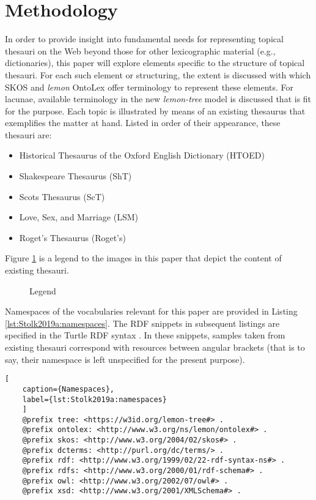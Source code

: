 \section{Methodology}

In order to provide insight into fundamental needs for representing topical thesauri on the Web beyond those for other lexicographic material (e.g., dictionaries), this paper will explore elements specific to the structure of topical thesauri. For each such element or structuring, the extent is discussed with which SKOS and \emph{lemon} OntoLex offer terminology to represent these elements. For lacunae, available terminology in the new \emph{lemon-tree} model is discussed that is fit for the purpose. Each topic is illustrated by means of an existing thesaurus that exemplifies the matter at hand. Listed in order of their appearance, these thesauri are:

\begin{itemize}
	\item Historical Thesaurus of the Oxford English Dictionary (HTOED) \cite{ref-HTOED}
	\item Shakespeare Thesaurus (ShT) \cite{ref-ShT}
	\item Scots Thesaurus (ScT) \cite{ref-ScT}
	\item Love, Sex, and Marriage (LSM) \cite{ref-LSM}
	\item Roget's Thesaurus (Roget's) \cite{ref-Roget}
\end{itemize}

\noindent
Figure \ref{fig:Stolk2019a:legend} is a legend to the images in this paper that depict the content of existing thesauri.

\begin{figure}[htbp]
	\framebox[\textwidth]{
		\scalebox{0.7}[0.7]{
			
		}
	}
	\caption[]{\label{fig:Stolk2019a:legend} Legend}
\end{figure} 

Namespaces of the vocabularies relevant for this paper are provided in Listing \ref{lst:Stolk2019a:namespaces}. The RDF snippets in subsequent listings are specified in the Turtle RDF syntax \cite{prudhommeaux_rdf_2014}. In these snippets, samples taken from existing thesauri correspond with resources between angular brackets (that is to say, their namespace is left unspecified for the present purpose).

\noindent
\begin{minipage}[c]{\textwidth}
	\begin{lstlisting}[
	caption={Namespaces},
	label={lst:Stolk2019a:namespaces}
	]
	@prefix tree: <https://w3id.org/lemon-tree#> .
	@prefix ontolex: <http://www.w3.org/ns/lemon/ontolex#> .
	@prefix skos: <http://www.w3.org/2004/02/skos#> .
	@prefix dcterms: <http://purl.org/dc/terms/> .
	@prefix rdf: <http://www.w3.org/1999/02/22-rdf-syntax-ns#> .
	@prefix rdfs: <http://www.w3.org/2000/01/rdf-schema#> .
	@prefix owl: <http://www.w3.org/2002/07/owl#> .
	@prefix xsd: <http://www.w3.org/2001/XMLSchema#> .
	\end{lstlisting}
\end{minipage}

